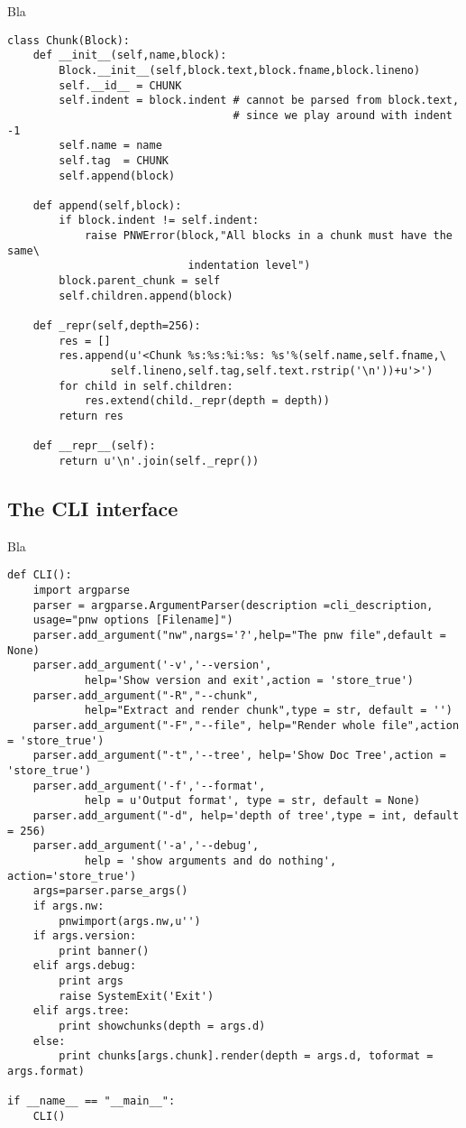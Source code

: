 \documentclass[neutral,proc,reqno]{ml-gen}
\begin{document}
Bla

\begin{lstlisting}
class Chunk(Block):
    def __init__(self,name,block):
        Block.__init__(self,block.text,block.fname,block.lineno)
        self.__id__ = CHUNK
        self.indent = block.indent # cannot be parsed from block.text, 
                                   # since we play around with indent -1
        self.name = name
        self.tag  = CHUNK
        self.append(block)

    def append(self,block):
        if block.indent != self.indent:
            raise PNWError(block,"All blocks in a chunk must have the same\
                            indentation level")
        block.parent_chunk = self
        self.children.append(block)

    def _repr(self,depth=256):
        res = []
        res.append(u'<Chunk %s:%s:%i:%s: %s'%(self.name,self.fname,\
                self.lineno,self.tag,self.text.rstrip('\n'))+u'>')
        for child in self.children:
            res.extend(child._repr(depth = depth))
        return res    

    def __repr__(self):
        return u'\n'.join(self._repr())
\end{lstlisting}
\subsection{The CLI interface}

Bla

\begin{lstlisting}
def CLI():
    import argparse
    parser = argparse.ArgumentParser(description =cli_description,
    usage="pnw options [Filename]")
    parser.add_argument("nw",nargs='?',help="The pnw file",default = None)
    parser.add_argument('-v','--version',
            help='Show version and exit',action = 'store_true')
    parser.add_argument("-R","--chunk",
            help="Extract and render chunk",type = str, default = '')
    parser.add_argument("-F","--file", help="Render whole file",action = 'store_true')
    parser.add_argument("-t",'--tree', help='Show Doc Tree',action = 'store_true')
    parser.add_argument('-f','--format', 
            help = u'Output format', type = str, default = None)
    parser.add_argument("-d", help='depth of tree',type = int, default = 256)
    parser.add_argument('-a','--debug',
            help = 'show arguments and do nothing', action='store_true')
    args=parser.parse_args()
    if args.nw:
        pnwimport(args.nw,u'')
    if args.version:
        print banner()
    elif args.debug:
        print args
        raise SystemExit('Exit')
    elif args.tree:
        print showchunks(depth = args.d)
    else:
        print chunks[args.chunk].render(depth = args.d, toformat = args.format)

if __name__ == "__main__":
    CLI()
\end{lstlisting}
\end{document}
